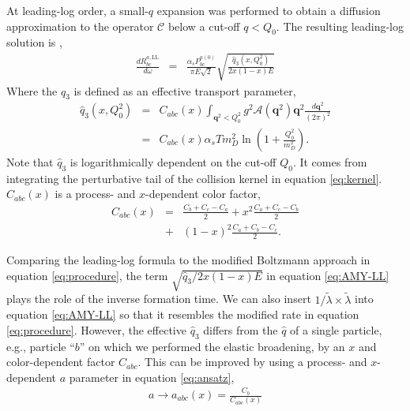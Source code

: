 \documentclass[aps, prc, reprint, amsmath, groupedaddress, nofootinbib]{revtex4-1}
\begin{document}
At leading-log order, a small-$q$ expansion was performed to obtain a diffusion approximation to the operator $\mathcal{C}$ below a cut-off $q<Q_0$.
The resulting leading-log solution is \cite{Arnold:2008zu},
\begin{eqnarray}\label{eq:AMY-LL}
\frac{dR_{bc}^{a,\textrm{LL}}}{d\omega} &=& \frac{\alpha_s P_{bc}^{a(0)}}{\pi E\sqrt{2}}
\sqrt{\frac{\hat{q}_3(x, Q_0^2)}{2x(1-x)E}}
\end{eqnarray}
Where the $\hat{q}_3$ is defined as an effective transport parameter,
\begin{eqnarray}
\hat{q}_3(x, Q_0^2) &=& C_{abc}(x) \int_{\mathbf{q}^2 < Q_0^2} g^2\mathcal{A}(\mathbf{q}^2) \mathbf{q}^2 \frac{d\mathbf{q}^2}{(2\pi)^2} \\
&=& C_{abc}(x) \alpha_s T m_D^2 \ln\left(1+\frac{Q_0^2}{m_D^2}\right).\label{eq:qhat3}
\end{eqnarray}
Note that $\hat{q}_3$ is logarithmically dependent on the cut-off $Q_0$.
It comes from integrating the perturbative tail of the collision kernel in equation \ref{eq:kernel}.
$C_{abc}(x)$ is a process- and $x$-dependent color factor,
\begin{eqnarray}
C_{abc}(x) &=&  \frac{C_b+C_c-C_a}{2} + x^2 \frac{C_a+C_c-C_b}{2} \\\nonumber
&+& (1-x)^2\frac{C_a+C_b-C_c}{2}.
\end{eqnarray}

Comparing the leading-log formula to the modified Boltzmann approach in equation \ref{eq:procedure}, the term $\sqrt{\hat{q}_3 / 2x(1-x)E}$ in equation \ref{eq:AMY-LL} plays the role of the inverse formation time.
We can also insert $1/\tilde{\lambda} \times \tilde{\lambda}$ into equation \ref{eq:AMY-LL} so that it resembles the modified rate in equation \ref{eq:procedure}.
However, the effective $\hat{q}_3$ differs from the $\hat{q}$ of a single particle, e.g., particle ``$b$'' on which we performed the elastic broadening, by an $x$ and color-dependent factor $C_{abc}$.
This can be improved by using a process- and $x$-dependent $a$ parameter in equation \ref{eq:ansatz},
\begin{eqnarray}
a \rightarrow a_{abc}(x) = \frac{C_b}{C_{abc}(x)}
\end{eqnarray}
\end{document}
